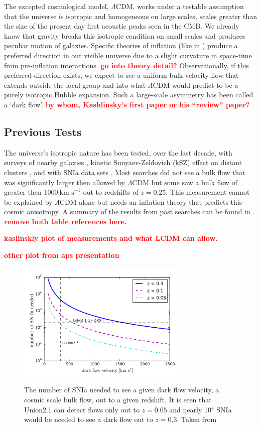 \documentclass[apj, iop]{emulateapj}
\newcommand{\sn}{SNIa}
\newcommand{\todo}[1]{\textbf{\textcolor{red}{#1}}}
\newcommand{\lcdm}{$\Lambda$CDM}     %
\newcommand{\kms}{\ensuremath{~\text{km s}^{-1}}}
\begin{document}
The excepted cosmological model, $\Lambda$CDM, works under a testable assumption
that the universe is isotropic and homogeneous on large scales, scales greater
than the size of the present day first acoustic peaks seen in the CMB.
We already
know that gravity breaks this isotropic condition on small scales and produces
peculiar motion of galaxies. Specific theories of inflation (like in
\cite{MersiniHoughton:2008io}) produce a preferred direction in our visible
universe due to a slight curvature in space-time from pre-inflation
interactions. \todo{go into theory detail?} Observationally, if this preferred
direction exists, we expect to see a  uniform bulk velocity flow that extends
outside the local group and into what $\Lambda$CDM would predict to be a purely
isotropic Hubble expansion. Such a large-scale asymmetry has been called a `dark
flow'. \todo{by whom, Kashlinsky's first paper or his ``review'' paper?}

\subsection{Previous Tests}\label{previous-tests}

The universe's isotropic nature has been tested, over the last decade, with
surveys of nearby galaxies \citep{Ma13}, kinetic Sunyaev-Zel\'{d}ovich (kSZ)
effect on distant clusters \citep{Kashlinsky10,Planckdf}, and with \sn{} data
sets \citep[and others as seen in ]{Dai11,Rathaus13}. Most
searches did not see a bulk flow that was significantly larger then allowed by
\lcdm{} but some saw a bulk flow of greater then $1000 \kms{}$ out to
redshifts of $z = 0.25$. This measurement cannot be explained by $\Lambda$CDM
alone but needs an inflation theory that predicts this cosmic anisotropy.  A
summary of the results from past searches can be found in .
\todo{remove both table references here.}

\todo{kaslinskly plot of measurements and what LCDM can allow.}

\todo{other plot from aps presentation}

\begin{figure}
	\includegraphics[width=3.2in]{what_dataset_size_v_velocity.pdf} 
    \caption{The number of \sn{} needed to see a given dark flow velocity, a
	cosmic scale bulk flow, out to a given redshift. It is seen that Union2.1 
	can detect flows only out to $z=0.05$ and nearly 10$^4$ \sn{} would be 
	needed to see a dark flow out to $z=0.3$. Taken from \cite{Mathews16}}
	\label{f:sn-needed} 
\end{figure}
\end{document}
